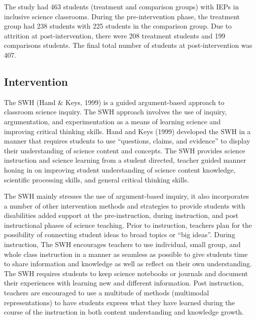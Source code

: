 \documentclass[11.5pt]{sig-alternate} %
\begin{document}
\begin{large}
The study had 463 students (treatment and comparison groups) with IEPs in inclusive science classrooms.  During the pre-intervention phase, the treatment group had 238 students with 225 students in the comparison group.  Due to attrition at post-intervention, there were 208 treatment students and 199 comparisons students.  The final total number of students at post-intervention was 407.  

\subsection*{Intervention}

The SWH (Hand \& Keys, 1999) is a guided argument-based approach to classroom science inquiry.  The SWH approach involves the use of inquiry, argumentation, and experimentation as a means of learning science and improving critical thinking skills.  Hand and Keys (1999) developed the SWH in a manner that requires students to use “questions, claims, and evidence” to display their understanding of science content and concepts.  The SWH provides science instruction and science learning from a student directed, teacher guided manner honing in on improving student understanding of science content knowledge, scientific processing skills, and general critical thinking skills.

The SWH mainly stresses the use of argument-based inquiry, it also incorporates a number of other intervention methods and strategies to provide students with disabilities added support at the pre-instruction, during instruction, and post instructional phases of science teaching.  Prior to instruction, teachers plan for the possibility of connecting student ideas to broad topics or “big ideas”.  During instruction, The SWH encourages teachers to use individual, small group, and whole class instruction in a manner as seamless as possible to give students time to share information and knowledge as well as reflect on their own understanding.  The SWH requires students to keep science notebooks or journals and document their experiences with learning new and different information.  Post instruction, teachers are encouraged to use a multitude of methods (multimodal representations) to have students express what they have learned during the course of the instruction in both content understanding and knowledge growth.


\end{large}
\end{document}
